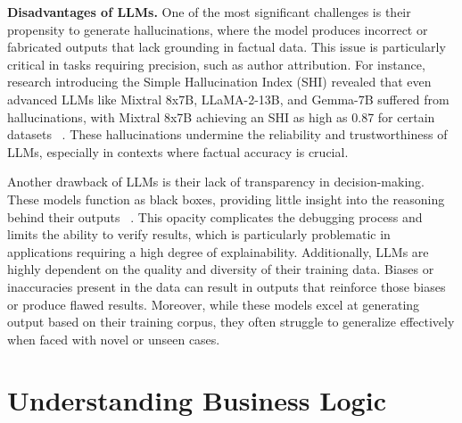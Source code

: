 \hspace{0.5cm} \textbf{Disadvantages of  LLMs.} One of the most significant challenges is their propensity to generate hallucinations, where the model produces incorrect or fabricated outputs that lack grounding in factual data. This issue is particularly critical in tasks requiring precision, such as author attribution. For instance, research introducing the Simple Hallucination Index (SHI) revealed that even advanced LLMs like Mixtral 8x7B, LLaMA-2-13B, and Gemma-7B suffered from hallucinations, with Mixtral 8x7B achieving an SHI as high as 0.87 for certain datasets ~\cite{LLMLimitations}. These hallucinations undermine the reliability and trustworthiness of LLMs, especially in contexts where factual accuracy is crucial. 

\hspace{0.5cm} Another drawback of LLMs is their lack of transparency in decision-making. These models function as black boxes, providing little insight into the reasoning behind their outputs ~\cite{LLMLimitations}. This opacity complicates the debugging process and limits the ability to verify results, which is particularly problematic in applications requiring a high degree of explainability. Additionally, LLMs are highly dependent on the quality and diversity of their training data. Biases or inaccuracies present in the data can result in outputs that reinforce those biases or produce flawed results. Moreover, while these models excel at generating output based on their training corpus, they often struggle to generalize effectively when faced with novel or unseen cases.



\section{Understanding Business Logic}

